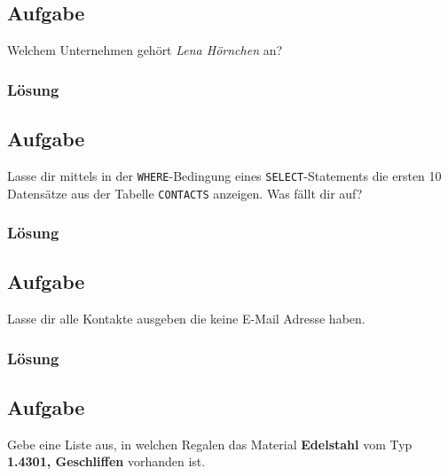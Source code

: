 \subsection{Aufgabe}
\label{sec:uebung_01.aufgabe_08}
Welchem Unternehmen gehört \textit{Lena Hörnchen} an?

\subsubsection*{Lösung}
\label{sec:uebung_01.aufgabe_08.loesung}

\subsection{Aufgabe}
\label{sec:uebung_01.aufgabe_09}
Lasse dir mittels  in der \texttt{WHERE}-Bedingung eines \texttt{SELECT}-Statements die ersten 10 Datensätze aus der Tabelle \texttt{CONTACTS} anzeigen. Was fällt dir auf?

\subsubsection*{Lösung}
\label{sec:uebung_01.aufgabe_09.loesung}

\subsection{Aufgabe}
\label{sec:uebung_01.aufgabe_10}
Lasse dir alle Kontakte ausgeben die keine E-Mail Adresse haben.

\subsubsection*{Lösung}
\label{sec:uebung_01.aufgabe_10.loesung}

\subsection{Aufgabe}
\label{sec:uebung_01.aufgabe_11}
Gebe eine Liste aus, in welchen Regalen das Material \textbf{Edelstahl} vom Typ \textbf{1.4301, Geschliffen} vorhanden ist.

